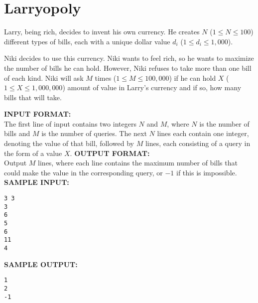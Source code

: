 \documentclass{article}
\begin{document}
\newcommand{\blank}{\vskip 3mm}
\setlength\parindent{0pt}
\renewcommand\thesection{\Alph{section}}

\setcounter{section}{6}
\section{Larryopoly}


Larry, being rich, decides to invent his own currency. He creates $ N $ ($ 1 \leq N \leq 100 $) different types of bills, each with a unique dollar value $ d_i $ ($ 1 \leq d_i \leq 1,000 $).

Niki decides to use this currency. Niki wants to feel rich, so he wants to maximize the number of bills he can hold. However, Niki refuses to take more than one bill of each kind. Niki will ask $ M $ times ($ 1 \leq M \leq 100,000 $) if he can hold $ X $ ($ 1 \leq X \leq 1,000,000 $) amount of value in Larry’s currency and if so, how many bills that will take.

\blank
\textbf{INPUT FORMAT:}\\
The first line of input contains two integers $ N $ and $ M $, where $ N $ is the number of bills and $ M $ is the number of queries.  The next $ N $ lines each contain one integer, denoting the value of that bill, followed by $ M $ lines, each consisting of a query in the form of a value $ X $.
\blank
\textbf{OUTPUT FORMAT:}\\
Output $ M $ lines, where each line contains the maximum number of bills that could make the value in the corresponding query, or $ -1 $ if this is impossible.
\blank
\textbf{SAMPLE INPUT:}
\begin{verbatim}
3 3
3
6
5
6
11
4
\end{verbatim}
\textbf{SAMPLE OUTPUT:}
\begin{verbatim}
1
2
-1
\end{verbatim}
\end{document}
